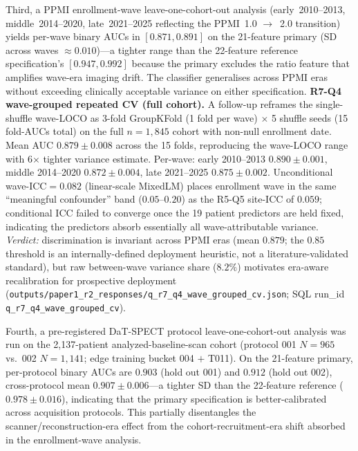Third, a PPMI enrollment-wave leave-one-cohort-out analysis (early~2010--2013, middle~2014--2020, late~2021--2025 reflecting the PPMI~1.0 $\rightarrow$~2.0 transition) yields per-wave binary AUCs in $[0.871, 0.891]$ on the 21-feature primary (SD across waves $\approx 0.010$)---a tighter range than the 22-feature reference specification's $[0.947, 0.992]$ because the primary excludes the ratio feature that amplifies wave-era imaging drift. The classifier generalises across PPMI eras without exceeding clinically acceptable variance on either specification. \textbf{R7-Q4 wave-grouped repeated CV (full cohort).} A follow-up reframes the single-shuffle wave-LOCO as 3-fold GroupKFold (1 fold per wave) $\times$ 5 shuffle seeds (15 fold-AUCs total) on the full $n{=}1{,}845$ cohort with non-null enrollment date. Mean AUC $0.879 \pm 0.008$ across the 15 folds, reproducing the wave-LOCO range with 6$\times$ tighter variance estimate. Per-wave: early 2010--2013 $0.890 \pm 0.001$, middle 2014--2020 $0.872 \pm 0.004$, late 2021--2025 $0.875 \pm 0.002$. Unconditional wave-ICC$=0.082$ (linear-scale MixedLM) places enrollment wave in the same ``meaningful confounder'' band ($0.05$--$0.20$) as the R5-Q5 site-ICC of $0.059$; conditional ICC failed to converge once the 19 patient predictors are held fixed, indicating the predictors absorb essentially all wave-attributable variance. \emph{Verdict:} discrimination is invariant across PPMI eras (mean $0.879$; the $0.85$ threshold is an internally-defined deployment heuristic, not a literature-validated standard), but raw between-wave variance share ($8.2\%$) motivates era-aware recalibration for prospective deployment (\texttt{outputs/paper1\_r2\_responses/q\_r7\_q4\_wave\_grouped\_cv.json}; SQL run\_id \texttt{q\_r7\_q4\_wave\_grouped\_cv}).

Fourth, a pre-registered DaT-SPECT protocol leave-one-cohort-out analysis was run on the 2,137-patient analyzed-baseline-scan cohort (protocol 001 $N{=}965$ vs.\ 002 $N{=}1{,}141$; edge training bucket 004 $+$ T011). On the 21-feature primary, per-protocol binary AUCs are $0.903$ (hold out 001) and $0.912$ (hold out 002), cross-protocol mean $0.907 \pm 0.006$---a tighter SD than the 22-feature reference ($0.978 \pm 0.016$), indicating that the primary specification is better-calibrated across acquisition protocols. This partially disentangles the scanner/reconstruction-era effect from the cohort-recruitment-era shift absorbed in the enrollment-wave analysis.

